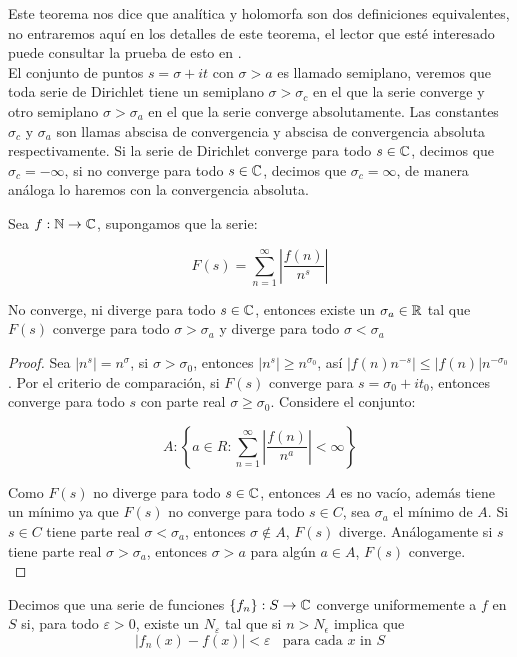 Este teorema nos dice que analítica y holomorfa son dos definiciones equivalentes, no entraremos aquí en los detalles de este teorema, el lector que esté interesado puede consultar la prueba de esto en \cite{stein2010complex}.\\


El conjunto de puntos $s=\sigma+it$ con $\sigma>a$ es llamado semiplano, veremos que toda serie de Dirichlet tiene un semiplano $\sigma>\sigma_c$ en el que la serie converge y otro semiplano $\sigma>\sigma_a$ en el que la serie converge absolutamente. Las constantes $\sigma_c$ y $\sigma_a$ son llamas abscisa de convergencia y abscisa de convergencia absoluta respectivamente. Si la serie de Dirichlet converge para todo $s\in \mathbb{C}$, decimos que $\sigma_c=-\infty$, si no converge para todo $s\in \mathbb{C}$, decimos que $\sigma_c=\infty$, de manera análoga lo haremos con la convergencia absoluta.\cite{pongsriiam2023analytic}


\begin{theorem}
Sea $f:\mathbb{N} \to \mathbb{C}$, supongamos que la serie:

$$F(s)=\sum_{n=1}^{\infty} \left| \frac{f(n)}{n^s}\right|$$

No converge, ni diverge para  todo $s\in \mathbb{C}$, entonces existe un $\sigma_a\in \mathbb{R}$ tal que $F(s)$ converge para todo $\sigma>\sigma_a$ y diverge para todo $\sigma<\sigma_a$
\end{theorem}

\begin{proof}
Sea $|n^s|=n^{\sigma}$, si $\sigma>\sigma_0$, entonces $|n^s|\geq n^{\sigma_0}$, así $|f(n)n^{-s}|\leq|f(n)|n^{-\sigma_0}$. Por el criterio de comparación, si $F(s)$ converge para $s=\sigma_0+i t_0$, entonces converge para todo $s$ con parte real $\sigma\geq\sigma_0$. Considere el conjunto:

$$A:\left\{a\in R : \sum_{n=1}^{\infty} \left|\frac{f(n)}{n^a}\right|<\infty\right\}$$

Como $F(s)$ no diverge para  todo $s\in\mathbb{C} $, entonces $A$ es no vacío, además tiene un mínimo ya que $F(s)$ no converge  para todo $s\in C$, sea $\sigma_a$ el mínimo de $A$. Si $s\in C$ tiene parte real $\sigma< \sigma_a$, entonces $\sigma\not\in A$, $F(s)$ diverge. Análogamente si $s$ tiene parte real $\sigma>\sigma_a$, entonces $\sigma>a$ para algún $a\in A$, $F(s)$ converge.\\
\end{proof}


\begin{definition}
Decimos que una serie de funciones $\{f_n\}:S\to \mathbb{C}$ converge uniformemente a $f$ en $S$ si, para todo $\varepsilon>0$, existe un $N_\varepsilon$ tal que si $n>N_\epsilon$ implica que
    $$|f_n(x)-f(x)|<\varepsilon\ \ \ \ \text{para cada $x$ in $S$}$$
\end{definition}

